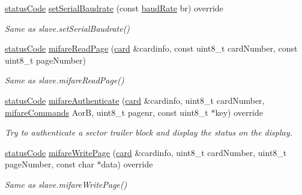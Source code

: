 \begin{DoxyCompactItemize}
\mbox{\label{classnfc_1_1NfcOled_aadcb1a6a9e6241c80ecd50de0d108907}} 
\hyperlink{declarations_8h_ae1d20c5a38cae82ccaa6a77be3fd264b}{status\+Code} \hyperlink{classnfc_1_1NfcOled_aadcb1a6a9e6241c80ecd50de0d108907}{set\+Serial\+Baudrate} (const \hyperlink{declarations_8h_a18236cb00569a8f612f8957044868f74}{baud\+Rate} br) override
\begin{DoxyCompactList}\small\item\em Same as slave.\+set\+Serial\+Baudrate() \end{DoxyCompactList}\item 
\mbox{\label{classnfc_1_1NfcOled_a87d38aa8fcb687e276f18ae691b4ff0f}} 
\hyperlink{declarations_8h_ae1d20c5a38cae82ccaa6a77be3fd264b}{status\+Code} \hyperlink{classnfc_1_1NfcOled_a87d38aa8fcb687e276f18ae691b4ff0f}{mifare\+Read\+Page} (\hyperlink{classcard}{card} \&cardinfo, const uint8\+\_\+t card\+Number, const uint8\+\_\+t page\+Number)
\begin{DoxyCompactList}\small\item\em Same as slave.\+mifare\+Read\+Page() \end{DoxyCompactList}\item 
\mbox{\label{classnfc_1_1NfcOled_a1168a23f48bec44eae8d65a1625736e5}} 
\hyperlink{declarations_8h_ae1d20c5a38cae82ccaa6a77be3fd264b}{status\+Code} \hyperlink{classnfc_1_1NfcOled_a1168a23f48bec44eae8d65a1625736e5}{mifare\+Authenticate} (\hyperlink{classcard}{card} \&cardinfo, uint8\+\_\+t card\+Number, \hyperlink{declarations_8h_a305b1a3bcfca65e2a82f0f9d24676835}{mifare\+Commands} AorB, uint8\+\_\+t pagenr, const uint8\+\_\+t $\ast$key) override
\begin{DoxyCompactList}\small\item\em Try to authenticate a sector trailer block and display the status on the display. \end{DoxyCompactList}\item 
\mbox{\label{classnfc_1_1NfcOled_a547e3a810432ebbb3e9a03dc7c2fa0c8}} 
\hyperlink{declarations_8h_ae1d20c5a38cae82ccaa6a77be3fd264b}{status\+Code} \hyperlink{classnfc_1_1NfcOled_a547e3a810432ebbb3e9a03dc7c2fa0c8}{mifare\+Write\+Page} (\hyperlink{classcard}{card} \&cardinfo, uint8\+\_\+t card\+Number, uint8\+\_\+t page\+Number, const char $\ast$data) override
\begin{DoxyCompactList}\small\item\em Same as slave.\+mifare\+Write\+Page() \end{DoxyCompactList}\item 

\end{DoxyCompactItemize}
